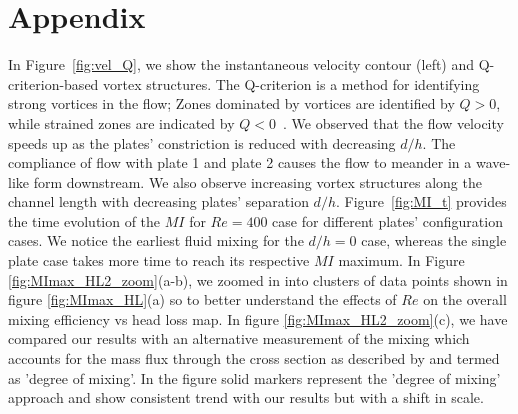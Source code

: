 \documentclass[reprint,a4paper,fleqn]{cas-dc} %
\begin{document}
		
		
		\section*{Appendix}
		
		In Figure~\ref{fig:vel_Q}, we show the instantaneous velocity contour (left) and Q-criterion-based vortex structures. The Q-criterion is a method for identifying strong vortices in the flow; Zones dominated by vortices are identified by $Q > 0$, while strained zones are indicated by $Q < 0$~\citep{Hunt1994, Hussain1995, Holmes2012, Rowley2014}. We observed that the flow velocity speeds up as the plates' constriction is reduced with decreasing $d/h$. The compliance of flow with plate 1 and plate 2 causes the flow to meander in a wave-like form downstream. We also observe increasing vortex structures along the channel length with decreasing plates' separation $d/h$.
		Figure~\ref{fig:MI_t} provides the time evolution of the $MI$ for $Re=400$ case for different plates' configuration cases. We notice the earliest fluid mixing for the $d/h=0$ case, whereas the single plate case takes more time to reach its respective $MI$ maximum.
		In Figure \ref{fig:MImax_HL2_zoom}(a-b), we zoomed in into clusters of data points shown in figure \ref{fig:MImax_HL}(a) so to better understand the effects of $Re$ on the overall mixing efficiency vs head loss map. In figure \ref{fig:MImax_HL2_zoom}(c), we have compared our results with an alternative measurement of the mixing which accounts for the mass flux through the cross section as described by \cite{Antognoli,Orsi,Galletti} and termed as 'degree of mixing'. In the figure solid markers represent the 'degree of mixing' approach  and show consistent trend with our results but with a shift in scale. 
		
		
		
\end{document}
